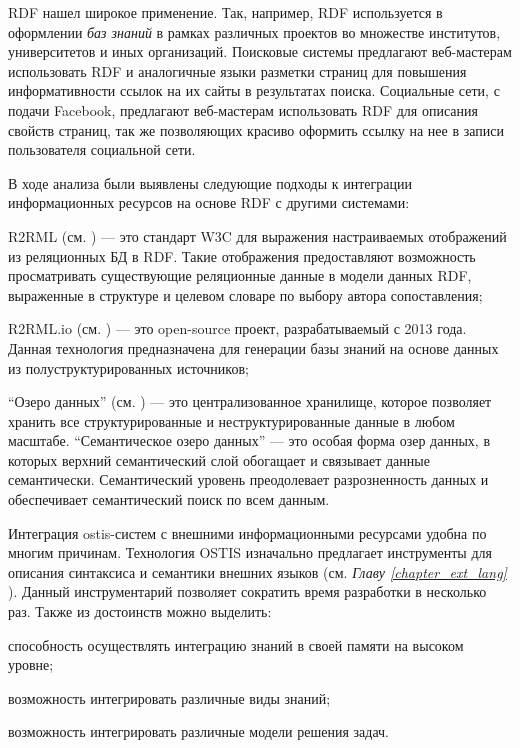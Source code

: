 RDF нашел широкое применение. Так, например, RDF используется в оформлении \textit{баз знаний} в рамках различных проектов во множестве институтов, университетов и иных организаций. Поисковые системы предлагают веб-мастерам использовать RDF и аналогичные языки разметки страниц для повышения информативности ссылок на их сайты в результатах поиска. Социальные сети, с подачи Facebook, предлагают веб-мастерам использовать RDF для описания свойств страниц, так же позволяющих красиво оформить ссылку на нее в записи пользователя социальной сети.

В ходе анализа были выявлены следующие подходы к интеграции информационных ресурсов на основе RDF с другими системами:
\begin{textitemize}
    \item R2RML (см. ) --- это стандарт W3C для выражения настраиваемых отображений из реляционных БД в RDF. Такие отображения предоставляют возможность просматривать существующие реляционные данные в модели данных RDF, выраженные в структуре и целевом словаре по выбору автора сопоставления;
    \item R2RML.io (см. ) --- это open-source проект, разрабатываемый с 2013 года. Данная технология предназначена для генерации базы знаний на основе данных из полуструктурированных источников;
    \item ``Озеро данных'' (см. ) --- это централизованное хранилище, которое позволяет хранить все структурированные и неструктурированные данные в любом масштабе. ``Семантическое озеро данных'' --- это особая форма озер данных, в которых верхний семантический слой обогащает и связывает данные семантически. Семантический уровень преодолевает разрозненность данных и обеспечивает семантический поиск по всем данным.
\end{textitemize}

Интеграция ostis-систем с внешними информационными ресурсами удобна по многим причинам. Технология OSTIS изначально предлагает инструменты для описания синтаксиса и семантики внешних языков (см. \textit{Главу \ref{chapter_ext_lang} }). Данный инструментарий позволяет сократить время разработки в несколько раз. Также из достоинств можно выделить:
\begin{textitemize}
    \item способность осуществлять интеграцию знаний в своей памяти на высоком уровне;
    \item возможность интегрировать различные виды знаний;
    \item возможность интегрировать различные модели решения задач.
\end{textitemize}

